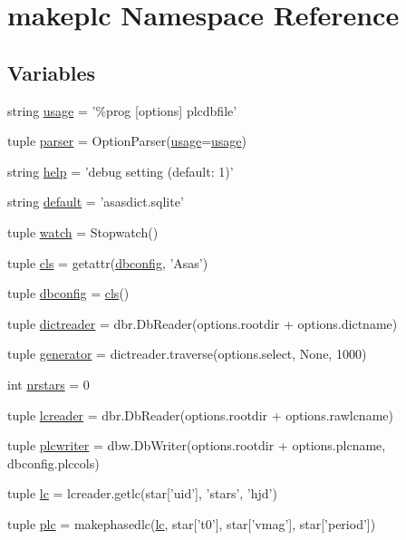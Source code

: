 \hypertarget{namespacemakeplc}{
\section{makeplc Namespace Reference}
\label{namespacemakeplc}
}
\subsection*{Variables}
\begin{DoxyCompactItemize}
\item 
string \hyperlink{namespacemakeplc_a9a367257ba494afb85e43b8b3330f85d}{usage} = '\%prog \mbox{[}options\mbox{]} plcdbfile'
\item 
tuple \hyperlink{namespacemakeplc_aab6ec9062bd8992b365ca1b87bdefa96}{parser} = OptionParser(\hyperlink{namespacemakeplc_a9a367257ba494afb85e43b8b3330f85d}{usage}=\hyperlink{namespacemakeplc_a9a367257ba494afb85e43b8b3330f85d}{usage})
\item 
string \hyperlink{namespacemakeplc_a10fe047bfff2e759a4f8901770a6597c}{help} = 'debug setting (default: 1)'
\item 
string \hyperlink{namespacemakeplc_ad959572cd67a037ec770664dbb029f57}{default} = 'asasdict.sqlite'
\item 
tuple \hyperlink{namespacemakeplc_a1864a766ba17f82fb5daa30ec53ebfee}{watch} = Stopwatch()
\item 
tuple \hyperlink{namespacemakeplc_aa363cd785ab9133a4d9130ea47440558}{cls} = getattr(\hyperlink{namespacemakeplc_aa325dc07aa5dad58f7a5a218990db561}{dbconfig}, 'Asas')
\item 
tuple \hyperlink{namespacemakeplc_aa325dc07aa5dad58f7a5a218990db561}{dbconfig} = \hyperlink{namespacemakeplc_aa363cd785ab9133a4d9130ea47440558}{cls}()
\item 
tuple \hyperlink{namespacemakeplc_ad8e5963c381ce077742f668aeef37804}{dictreader} = dbr.DbReader(options.rootdir + options.dictname)
\item 
tuple \hyperlink{namespacemakeplc_a17113af2691a7272ebf921222e1324f5}{generator} = dictreader.traverse(options.select, None, 1000)
\item 
int \hyperlink{namespacemakeplc_a43b5a6c8a05f627a17aa3b40af795fa1}{nrstars} = 0
\item 
tuple \hyperlink{namespacemakeplc_af91c68b5354b2ec9e425193cbef8c891}{lcreader} = dbr.DbReader(options.rootdir + options.rawlcname)
\item 
tuple \hyperlink{namespacemakeplc_a2c82609fe79c419d6b3d30f44248d69d}{plcwriter} = dbw.DbWriter(options.rootdir + options.plcname, dbconfig.plccols)
\item 
tuple \hyperlink{namespacemakeplc_af12c0b1bc2c82c6cf31e8b47b879ad3c}{lc} = lcreader.getlc(star\mbox{[}'uid'\mbox{]}, 'stars', 'hjd')
\item 
tuple \hyperlink{namespacemakeplc_a4f42d119fcf8a7c4857425571da8bcf4}{plc} = makephasedlc(\hyperlink{namespacemakeplc_af12c0b1bc2c82c6cf31e8b47b879ad3c}{lc}, star\mbox{[}'t0'\mbox{]}, star\mbox{[}'vmag'\mbox{]}, star\mbox{[}'period'\mbox{]})
\end{DoxyCompactItemize}


